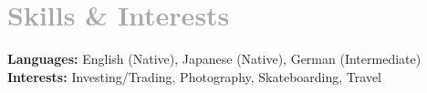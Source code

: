 \documentclass{article}
\begin{document}
{\section[Skills \& Interests \hfill]{\textcolor{darkgray}{Skills \& Interests \sout{\hfill}}}
        {\bfseries Languages: }English (Native), Japanese (Native), German (Intermediate)\\
        {\bfseries Interests: }Investing/Trading, Photography, Skateboarding, Travel

}%
\end{document}
